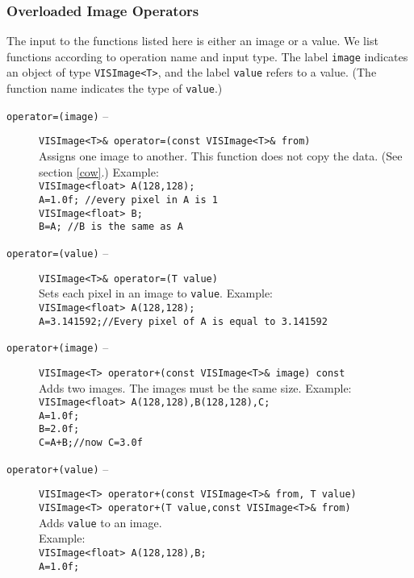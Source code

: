 \subsubsection{Overloaded Image Operators}
\label{il_oio}
The input to the functions listed here is either an image or a value.
We list functions according to operation name and input type.
The label {\tt image} indicates
an object of type {\tt VISImage<T>}, and the label
{\tt value} refers to a value.
(The function name indicates the type of {\tt value}.)
\begin{description}
\item[{\tt operator=(image)} --]
{\tt VISImage<T>\& operator=(const VISImage<T>\& from)}\\
Assigns one image to another.  This function does not copy
the data.  (See section \ref{cow}.)  Example:\\
{\tt VISImage<float> A(128,128);}\\
{\tt A=1.0f; //every pixel in A is 1}\\
{\tt VISImage<float> B;}\\
{\tt B=A; //B is the same as A}
\item[{\tt operator=(value)} --]
{\tt VISImage<T>\& operator=(T value)}\\
Sets each pixel in an image to {\tt value}.  Example:\\
{\tt VISImage<float> A(128,128);}\\
{\tt A=3.141592;//Every pixel of A is equal to 3.141592}\\
\item [{\tt operator+(image)} --]
{\tt VISImage<T> operator+(const VISImage<T>\& image) const}\\
Adds two images.  The images must be the same size.  Example:\\
{\tt VISImage<float> A(128,128),B(128,128),C;}\\
{\tt A=1.0f;}\\
{\tt B=2.0f;}\\
{\tt C=A+B;//now C=3.0f}
\item[{\tt operator+(value)} --]
{\tt VISImage<T> operator+(const VISImage<T>\& from, T value)}\\
{\tt VISImage<T> operator+(T value,const VISImage<T>\& from)}\\
Adds {\tt value} to an image.\\
Example:\\
{\tt VISImage<float> A(128,128),B;}\\
{\tt A=1.0f;}\\

\end{description}
